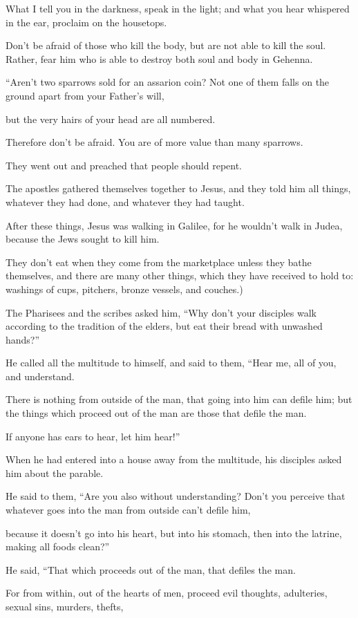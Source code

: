 What I tell you in the darkness, speak in the light; and what you hear whispered in the ear, proclaim on the housetops.

Don’t be afraid of those who kill the body, but are not able to kill the soul. Rather, fear him who is able to destroy both soul and body in Gehenna.

“Aren’t two sparrows sold for an assarion coin? Not one of them falls on the ground apart from your Father’s will,

but the very hairs of your head are all numbered.

Therefore don’t be afraid. You are of more value than many sparrows.

They went out and preached that people should repent.

The apostles gathered themselves together to Jesus, and they told him all things, whatever they had done, and whatever they had taught.

After these things, Jesus was walking in Galilee, for he wouldn’t walk in Judea, because the Jews sought to kill him.

They don’t eat when they come from the marketplace unless they bathe themselves, and there are many other things, which they have received to hold to: washings of cups, pitchers, bronze vessels, and couches.)

The Pharisees and the scribes asked him, “Why don’t your disciples walk according to the tradition of the elders, but eat their bread with unwashed hands?”

He called all the multitude to himself, and said to them, “Hear me, all of you, and understand.

There is nothing from outside of the man, that going into him can defile him; but the things which proceed out of the man are those that defile the man.

If anyone has ears to hear, let him hear!”

When he had entered into a house away from the multitude, his disciples asked him about the parable.

He said to them, “Are you also without understanding? Don’t you perceive that whatever goes into the man from outside can’t defile him,

because it doesn’t go into his heart, but into his stomach, then into the latrine, making all foods clean?”

He said, “That which proceeds out of the man, that defiles the man.

For from within, out of the hearts of men, proceed evil thoughts, adulteries, sexual sins, murders, thefts,



